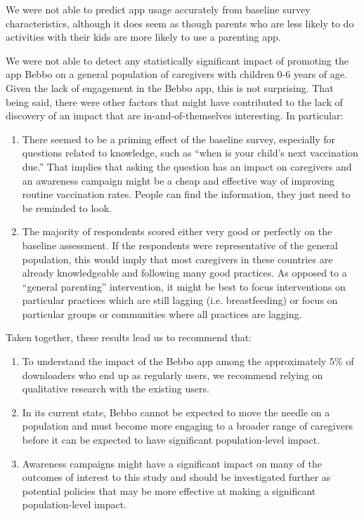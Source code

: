 \documentclass{article}
\begin{document}
We were not able to predict app usage accurately from baseline survey characteristics, although it does seem as though parents who are less likely to do activities with their kids are more likely to use a parenting app.

We were not able to detect any statistically significant impact of promoting the app Bebbo on a general population of caregivers with children 0-6 years of age. Given the lack of engagement in the Bebbo app, this is not surprising. That being said, there were other factors that might have contributed to the lack of discovery of an impact that are in-and-of-themselves interesting. In particular:

\begin{enumerate}
\item There seemed to be a priming effect of the baseline survey, especially for questions related to knowledge, such as ``when is your child's next vaccination due.'' That implies that asking the question has an impact on caregivers and an awareness campaign might be a cheap and effective way of improving routine vaccination rates. People can find the information, they just need to be reminded to look.
\item The majority of respondents scored either very good or perfectly on the baseline assessment. If the respondents were representative of the general population, this would imply that most caregivers in these countries are already knowledgeable and following many good practices. As opposed to a ``general parenting'' intervention, it might be best to focus interventions on particular practices which are still lagging (i.e. breastfeeding) or focus on particular groups or communities where all practices are lagging.
\end{enumerate}

Taken together, these results lead us to recommend that:

\begin{enumerate}
\item To understand the impact of the Bebbo app among the approximately 5\% of downloaders who end up as regularly users, we recommend relying on qualitative research with the existing users.
\item In its current state, Bebbo cannot be expected to move the needle on a population and must become more engaging to a broader range of caregivers before it can be expected to have significant population-level impact.
\item Awareness campaigns might have a significant impact on many of the outcomes of interest to this study and should be investigated further as potential policies that may be more effective at making a significant population-level impact.
\end{enumerate}
\end{document}
